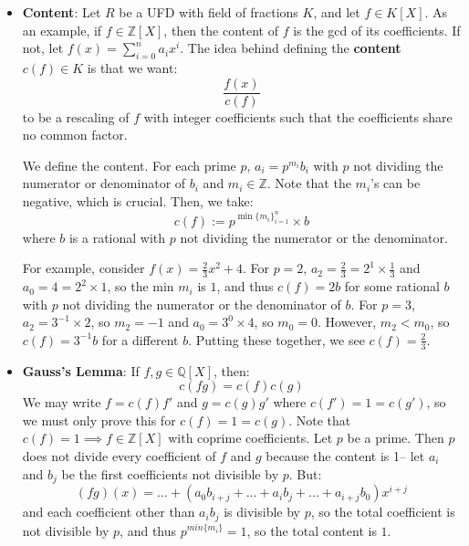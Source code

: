 \documentclass[11pt, oneside]{amsart}   	%
\theoremstyle{definition}
\newtheorem{lemma}[theorem]{Lemma}
\begin{document}
\begin{itemize}
	\begin{lemma} 
	If $G$ is a finite abelian group with $\leq n$ elements of order $n$ for all $n\in \mathbb N$, then $G$ is cyclic. 
	\end{lemma}
	
	\begin{proof}
		Since $G$ is finite and abelian, $G\cong \oplus_{i = 1}^m \mathbb Z / p_i^{n_i}\mathbb Z$. If some $p_i = p_j$ for $i\neq j$, then 
		$G$ has $p_i^2 - 1$ elements of order $p_i$, , contradicting our assumption, so all the $p_i$ are distinct. But $\mathbb Z / a\mathbb Z
		\oplus \mathbb Z / b\mathbb Z\cong \mathbb Z / ab\mathbb Z$ if $a$ and $b$ are coprime, and so this proves the assertion.
	\end{proof}
	
	\item \textbf{Content}: Let $R$ be a UFD with field of fractions $K$, and let $f\in K[X]$. As an example, if $f\in \mathbb Z [X]$, then the content of $f$ 
	is the gcd of its coefficients. If not, let $f(x) = \sum_{i = 0}^n a_ix^i$. The idea behind defining the \textbf{content} $c(f)\in K$ is that we want:
	$$
		\frac{f(x)}{c(f)}
	$$
	to be a rescaling of $f$ with integer coefficients such that the coefficients share no common factor. 
	
	We define the content. For each prime $p$, $a_i = p^{m_i}b_i$ with $p$ not dividing the numerator or denominator of $b_i$ and $m_i\in\mathbb Z$. 
	Note that the $m_i$'s can be negative, which is crucial. Then, we take:
	$$
		c(f) := p^{\min \{m_i\}_{i = 1}^n}\times b
	$$
	where $b$ is a rational with $p$ not dividing the numerator or the denominator. 
	
	For example, consider $f(x) = \frac{2}{3}x^2 + 4$. For $p = 2$, $a_2 = \frac{2}{3} = 2^1\times\frac{1}{3}$ and $a_0 = 4 = 2^2\times 1$, so the min 
	$m_i$ is $1$, and thus $c(f) = 2b$ for some rational $b$ with $p$ not dividing the numerator or the denominator of $b$. For $p = 3$, $a_2 = 3^{-1}
	\times 2$, so $m_2 = -1$ and $a_0 = 3^0\times 4$, so $m_0 = 0$. However, $m_2 < m_0$, so $c(f) = 3^{-1}b$ for a different $b$. Putting these 
	together, we see $c(f) = \frac{2}{3}$. 
	
	\item \textbf{Gauss's Lemma}: If $f, g\in\mathbb Q[X]$, then:
	$$
		c(fg) = c(f)c(g)
	$$
	We may write $f = c(f)f'$ and $g = c(g)g'$ where $c(f') = 1 = c(g')$, so we must only prove this for $c(f) = 1 = c(g)$. Note that $c(f) = 1\implies f\in
	\mathbb Z[X]$ with coprime coefficients. Let $p$ be a prime. Then $p$ does not divide every coefficient of $f$ and $g$ because the content is 1-- let 
	$a_i$ and $b_j$ be the first coefficients not divisible by $p$. But:
	$$
		(fg)(x) = ... + (a_0b_{i + j} + ... + a_ib_j + ... + a_{i + j}b_0)x^{i + j}
	$$
	and each coefficient other than $a_ib_j$ is divisible by $p$, so the total coefficient is not divisible by $p$, and thus $p^{min\{m_i\}} = 1$, so the total 
	content is $1$.
	

\end{itemize}
\end{document}
